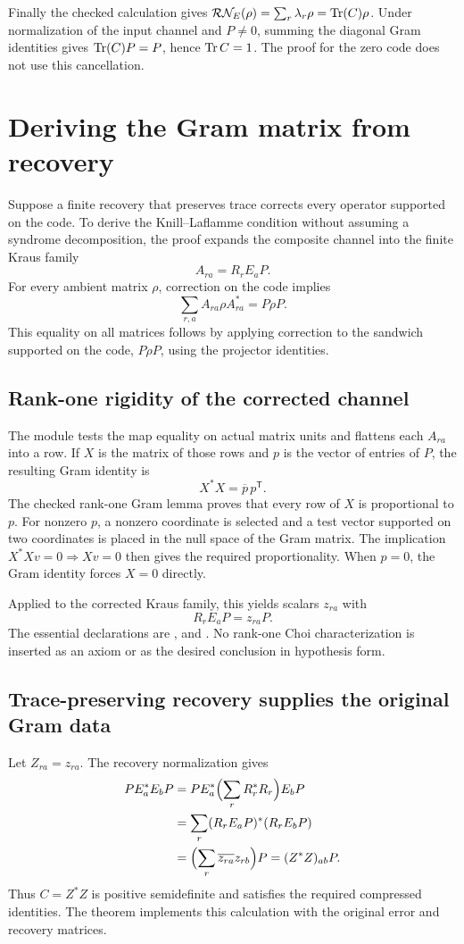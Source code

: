 Finally the checked calculation gives $\mathcal R\mathcal N_E(\rho)=\sum_r\lambda_r\rho=\Tr(C)\rho$. Under normalization of the input channel and $P\ne0$, summing the diagonal Gram identities gives $\operatorname{Tr}(C)P=P$, hence $\operatorname{Tr} C=1$. The proof for the zero code does not use this cancellation.



\section{Deriving the Gram matrix from recovery}\label{supp5:section:003}
Suppose a finite recovery that preserves trace corrects every operator supported on the code. To derive the Knill--Laflamme condition without assuming a syndrome decomposition, the proof expands the composite channel into the finite Kraus family
\[
A_{ra}=R_rE_aP.
\]
For every ambient matrix $\rho$, correction on the code implies
\[
\sum_{r,a} A_{ra}\rho A_{ra}^*=P\rho P.
\]
This equality on all matrices follows by applying correction to the sandwich supported on the code, $P\rho P$, using the projector identities.

\subsection{Rank-one rigidity of the corrected channel}
The module tests the map equality on actual matrix units and flattens each $A_{ra}$ into a row. If $X$ is the matrix of those rows and $p$ is the vector of entries of $P$, the resulting Gram identity is
\[
X^*X=\overline p\,p^{\mathsf T}.
\]
The checked rank-one Gram lemma proves that every row of $X$ is proportional to $p$. For nonzero $p$, a nonzero coordinate is selected and a test vector supported on two coordinates is placed in the null space of the Gram matrix. The implication $X^*Xv=0\Rightarrow Xv=0$ then gives the required proportionality. When $p=0$, the Gram identity forces $X=0$ directly.

Applied to the corrected Kraus family, this yields scalars $z_{ra}$ with
\[
R_rE_aP=z_{ra}P.
\]
The essential declarations are ,  and . No rank-one Choi characterization is inserted as an axiom or as the desired conclusion in hypothesis form.

\subsection{Trace-preserving recovery supplies the original Gram data}
Let $Z_{ra}=z_{ra}$. The recovery normalization gives
\begin{align*}
PE_a^*E_bP
&=PE_a^*\Bigl(\sum_rR_r^*R_r\Bigr)E_bP\\
&=\sum_r(R_rE_aP)^*(R_rE_bP)\\
&=\Bigl(\sum_r\overline{z_{ra}}z_{rb}\Bigr)P
=(Z^*Z)_{ab}P.
\end{align*}
Thus $C=Z^*Z$ is positive semidefinite and satisfies the required compressed identities. The theorem  implements this calculation with the original error and recovery matrices.

